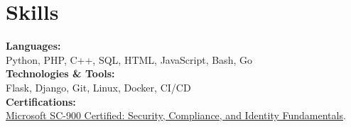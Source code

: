 \documentclass[a4paper,8pt]{article}
\begin{document}
\section{Skills}
\color[HTML]{1C033C}\textbf{Languages:} \\[2pt]
\color[HTML]{371e77} \hspace*{4ex} Python, PHP, C++, SQL, HTML, JavaScript, Bash, Go\\[3pt]
\color[HTML]{1C033C}\textbf{Technologies \& Tools:} \\[2pt]
\color[HTML]{371e77} \hspace*{4ex} Flask, Django, Git, Linux, Docker, CI/CD\\[3pt]
\color[HTML]{1C033C}\textbf{Certifications:} \\[2pt]
\color[HTML]{371e77} \hspace*{4ex} \uline{\href{https://learn.microsoft.com/}{Microsoft SC-900 Certified: Security, Compliance, and Identity Fundamentals}}.
\end{document}
